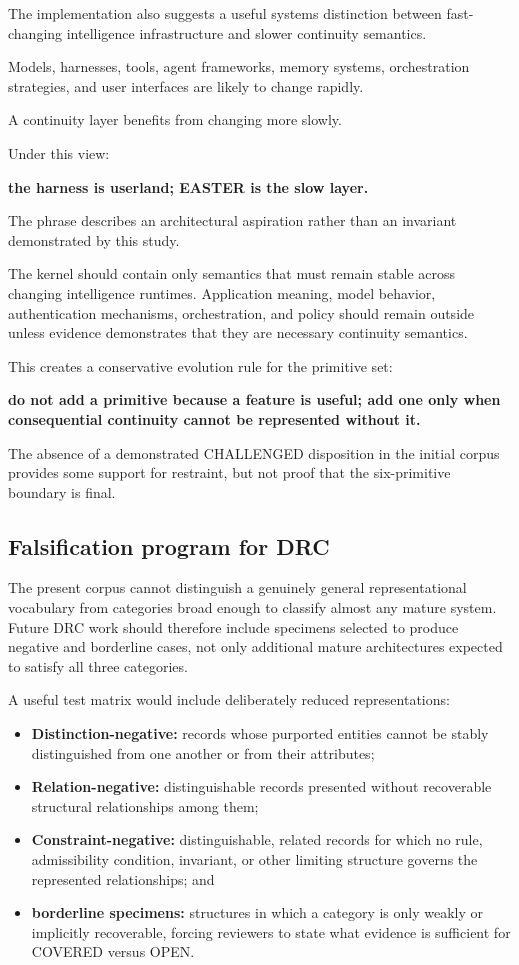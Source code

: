 \documentclass[11pt]{article}
\begin{document}
The implementation also suggests a useful systems distinction between fast-changing intelligence infrastructure and slower continuity semantics.

Models, harnesses, tools, agent frameworks, memory systems, orchestration strategies, and user interfaces are likely to change rapidly.

A continuity layer benefits from changing more slowly.

Under this view:

\textbf{the harness is userland; EASTER is the slow layer.}

The phrase describes an architectural aspiration rather than an invariant demonstrated by this study.

The kernel should contain only semantics that must remain stable across changing intelligence runtimes. Application meaning, model behavior, authentication mechanisms, orchestration, and policy should remain outside unless evidence demonstrates that they are necessary continuity semantics.

This creates a conservative evolution rule for the primitive set:

\textbf{do not add a primitive because a feature is useful; add one only when consequential continuity cannot be represented without it.}

The absence of a demonstrated CHALLENGED disposition in the initial corpus provides some support for restraint, but not proof that the six-primitive boundary is final.

\subsection{Falsification program for DRC}

The present corpus cannot distinguish a genuinely general representational vocabulary from categories broad enough to classify almost any mature system. Future DRC work should therefore include specimens selected to produce negative and borderline cases, not only additional mature architectures expected to satisfy all three categories.

A useful test matrix would include deliberately reduced representations:

\begin{itemize}
\item \textbf{Distinction-negative:} records whose purported entities cannot be stably distinguished from one another or from their attributes;
\item \textbf{Relation-negative:} distinguishable records presented without recoverable structural relationships among them;
\item \textbf{Constraint-negative:} distinguishable, related records for which no rule, admissibility condition, invariant, or other limiting structure governs the represented relationships; and
\item \textbf{borderline specimens:} structures in which a category is only weakly or implicitly recoverable, forcing reviewers to state what evidence is sufficient for COVERED versus OPEN.
\end{itemize}
\end{document}
